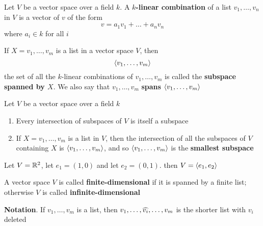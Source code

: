 \documentclass[11pt]{article}
\begin{document}
 
\begin{definition}[]
Let \(V\) be a vector space over a field \(k\). A \textbf{\(k\)-linear combination} of a
list \(v_1,\dots,v_n\) in \(V\) is a vector of \(v\) of the form
\begin{equation*}
v=a_1v_1+\dots+a_nv_n
\end{equation*}
where \(a_i\in k\) for all \(i\)
\end{definition}

\begin{definition}[]
If \(X=v_1,\dots,v_m\) is a list in a vector space \(V\), then
\begin{equation*}
\langle v_1,\dots,v_m\rangle
\end{equation*}
the set of all the \(k\)-linear combinations of \(v_1,\dots,v_m\) is called
the \textbf{subspace spanned by \(X\)}. We also say that \(v_1,\dots,v_m\) \textbf{spans}
\(\langle v_1,\dots,v_m\rangle\)
\end{definition}

\begin{lemma}[]
Let \(V\) be a vector space over a field \(k\)
\begin{enumerate}
\item Every intersection of subspaces of \(V\) is itself a subspace
\item If \(X=v_1,\dots,v_m\) is a list in \(V\), then the intersection of all the
subspaces of \(V\) containing \(X\) is \(\langle v_1,\dots,v_m\rangle\), and so 
\(\langle v_1,\dots,v_m\rangle\) is the \textbf{smallest subspace}
\end{enumerate}
\end{lemma}

\begin{examplle}[]
Let \(V=\mathbb{R}^2\), let \(e_1=(1,0)\) and let \(e_2=(0,1)\). then \(V=\langle
       e_1,e_2\rangle\) 
\end{examplle}

\begin{definition}[]
A vector space \(V\) is called \textbf{finite-dimensional} if it is spanned by a finite
list; otherwise \(V\) is called \textbf{infinite-dimensional}
\end{definition}

\textbf{Notation}. If \(v_1,\dots,v_m\) is a list, then
\(v_1,\dots,\what{v_i},\dots,v_m\) is the shorter list with \(v_i\) deleted
\end{document}
